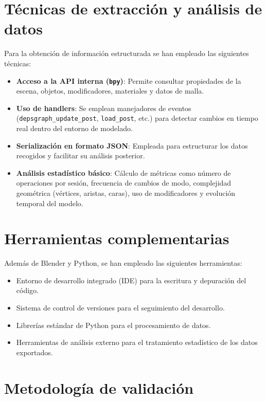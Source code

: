 \section{Técnicas de extracción y análisis de datos}

Para la obtención de información estructurada se han empleado las siguientes técnicas:

\begin{itemize}
    \item \textbf{Acceso a la API interna (\texttt{bpy})}: Permite consultar propiedades de la escena, objetos, modificadores, materiales y datos de malla.
    
    \item \textbf{Uso de handlers}: Se emplean manejadores de eventos (\texttt{depsgraph\_update\_post}, \texttt{load\_post}, etc.) para detectar cambios en tiempo real dentro del entorno de modelado.
    
    \item \textbf{Serialización en formato JSON}: Empleada para estructurar los datos recogidos y facilitar su análisis posterior.
    
    \item \textbf{Análisis estadístico básico}: Cálculo de métricas como número de operaciones por sesión, frecuencia de cambios de modo, complejidad geométrica (vértices, aristas, caras), uso de modificadores y evolución temporal del modelo.
\end{itemize}

\section{Herramientas complementarias}

Además de Blender y Python, se han empleado las siguientes herramientas:

\begin{itemize}
    \item Entorno de desarrollo integrado (IDE) para la escritura y depuración del código.
    \item Sistema de control de versiones para el seguimiento del desarrollo.
    \item Librerías estándar de Python para el procesamiento de datos.
    \item Herramientas de análisis externo para el tratamiento estadístico de los datos exportados.
\end{itemize}

\section{Metodología de validación}

